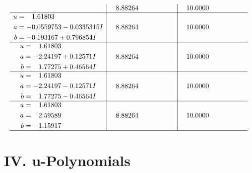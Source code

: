 \documentclass[1p]{elsarticle_modified}
\theoremstyle{definition}
\begin{document}
$$\begin{array}{c|c|c}
 & \phantom{-}8.88264\phantom{ +0.000000I} & \phantom{-}10.0000\phantom{ +0.000000I} \\ \hline\begin{aligned}
u &= \phantom{-}1.61803\phantom{ +0.000000I} \\
a &= -0.0559753 - 0.0335315 I \\
b &= -0.193167 + 0.796854 I\end{aligned}
 & \phantom{-}8.88264\phantom{ +0.000000I} & \phantom{-}10.0000\phantom{ +0.000000I} \\ \hline\begin{aligned}
u &= \phantom{-}1.61803\phantom{ +0.000000I} \\
a &= -2.24197 + 0.12571 I \\
b &= \phantom{-}1.77275 + 0.46564 I\end{aligned}
 & \phantom{-}8.88264\phantom{ +0.000000I} & \phantom{-}10.0000\phantom{ +0.000000I} \\ \hline\begin{aligned}
u &= \phantom{-}1.61803\phantom{ +0.000000I} \\
a &= -2.24197 - 0.12571 I \\
b &= \phantom{-}1.77275 - 0.46564 I\end{aligned}
 & \phantom{-}8.88264\phantom{ +0.000000I} & \phantom{-}10.0000\phantom{ +0.000000I} \\ \hline\begin{aligned}
u &= \phantom{-}1.61803\phantom{ +0.000000I} \\
a &= \phantom{-}2.59589\phantom{ +0.000000I} \\
b &= -1.15917\phantom{ +0.000000I}\end{aligned}
 & \phantom{-}8.88264\phantom{ +0.000000I} & \phantom{-}10.0000\phantom{ +0.000000I}\\
 \hline 
 \end{array}$$\newpage
\newpage\renewcommand{\arraystretch}{1}
\centering \section*{ IV. u-Polynomials}
\end{document}
